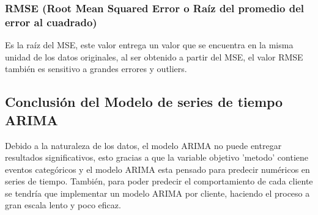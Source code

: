 \subsubsection{RMSE (Root Mean Squared Error o Raíz del promedio del error al cuadrado)}

Es la raíz del MSE, este valor entrega un valor que se encuentra en la misma unidad de los datos originales, al ser obtenido a partir del MSE, el valor RMSE también es sensitivo a grandes errores y outliers.

\subsection{Conclusión del Modelo de series de tiempo ARIMA}

Debido a la naturaleza de los datos, el modelo ARIMA no puede entregar resultados significativos, esto gracias a que la variable objetivo 'metodo' contiene eventos categóricos y el modelo ARIMA esta pensado para predecir numéricos en series de tiempo. También, para poder predecir el comportamiento de cada cliente se tendría que implementar un modelo ARIMA por cliente, haciendo el proceso a gran escala lento y poco eficaz.
